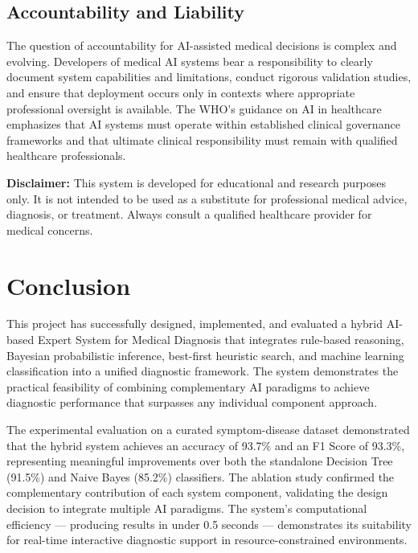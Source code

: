 \documentclass[12pt,a4paper]{article}
\begin{document}
\subsection{Accountability and Liability}

The question of accountability for AI-assisted medical decisions is complex and evolving. Developers of medical AI systems bear a responsibility to clearly document system capabilities and limitations, conduct rigorous validation studies, and ensure that deployment occurs only in contexts where appropriate professional oversight is available. The WHO's guidance on AI in healthcare \cite{who} emphasizes that AI systems must operate within established clinical governance frameworks and that ultimate clinical responsibility must remain with qualified healthcare professionals.

\noindent\textbf{Disclaimer:} This system is developed for educational and research purposes only. It is not intended to be used as a substitute for professional medical advice, diagnosis, or treatment. Always consult a qualified healthcare provider for medical concerns.

\section{Conclusion}

This project has successfully designed, implemented, and evaluated a hybrid AI-based Expert System for Medical Diagnosis that integrates rule-based reasoning, Bayesian probabilistic inference, best-first heuristic search, and machine learning classification into a unified diagnostic framework. The system demonstrates the practical feasibility of combining complementary AI paradigms to achieve diagnostic performance that surpasses any individual component approach.

The experimental evaluation on a curated symptom-disease dataset demonstrated that the hybrid system achieves an accuracy of 93.7\% and an F1 Score of 93.3\%, representing meaningful improvements over both the standalone Decision Tree (91.5\%) and Naive Bayes (85.2\%) classifiers. The ablation study confirmed the complementary contribution of each system component, validating the design decision to integrate multiple AI paradigms. The system's computational efficiency --- producing results in under 0.5 seconds --- demonstrates its suitability for real-time interactive diagnostic support in resource-constrained environments.
\end{document}
